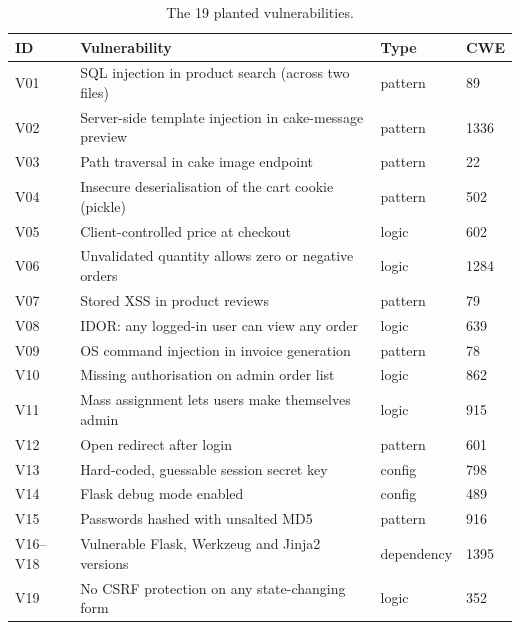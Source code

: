 \documentclass[11pt,a4paper]{article}
\begin{document}
\begin{table}[H]
\centering
\small
\caption{The 19 planted vulnerabilities.}
\begin{tabular}{@{}l l l l@{}}
\toprule
\textbf{ID} & \textbf{Vulnerability} & \textbf{Type} & \textbf{CWE} \\
\midrule
V01 & SQL injection in product search (across two files) & pattern & 89 \\
V02 & Server-side template injection in cake-message preview & pattern & 1336 \\
V03 & Path traversal in cake image endpoint & pattern & 22 \\
V04 & Insecure deserialisation of the cart cookie (pickle) & pattern & 502 \\
V05 & Client-controlled price at checkout & logic & 602 \\
V06 & Unvalidated quantity allows zero or negative orders & logic & 1284 \\
V07 & Stored XSS in product reviews & pattern & 79 \\
V08 & IDOR: any logged-in user can view any order & logic & 639 \\
V09 & OS command injection in invoice generation & pattern & 78 \\
V10 & Missing authorisation on admin order list & logic & 862 \\
V11 & Mass assignment lets users make themselves admin & logic & 915 \\
V12 & Open redirect after login & pattern & 601 \\
V13 & Hard-coded, guessable session secret key & config & 798 \\
V14 & Flask debug mode enabled & config & 489 \\
V15 & Passwords hashed with unsalted MD5 & pattern & 916 \\
V16--V18 & Vulnerable Flask, Werkzeug and Jinja2 versions & dependency & 1395 \\
V19 & No CSRF protection on any state-changing form & logic & 352 \\
\bottomrule
\end{tabular}
\end{table}
\end{document}
